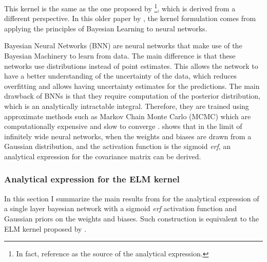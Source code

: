 This kernel is the same as the one proposed by \textcite{williamsComputationInfiniteNeural1998}\footnote{
    In fact, \textcite{frenayParameterinsensitiveKernelExtreme2011} reference \textcite{williamsComputationInfiniteNeural1998} as the source of the analytical
expression.}, which is derived from a different perspective.
In this older paper by \citeauthor{williamsComputationInfiniteNeural1998}, the kernel formulation comes from
applying the principles of Bayesian Learning to neural networks\cite{nealBayesianLearningNeural1996,bishopBayesianNeuralNetworks1997}.

Bayesian Neural Networks (BNN) are neural networks that make use of the Bayesian Machinery to learn
from data. The main difference is that these networks use distributions instead of point estimates\cite{nealBayesianLearningNeural1996}.
This allows the network to have a better understanding of the uncertainty of the data, which reduces
overfitting and allows having uncertainty estimates for the predictions. The main drawback of BNNs
is that they require computation of the posterior distribution, which is an analytically intractable
integral. Therefore, they are trained using approximate methods such as Markov Chain Monte Carlo (MCMC) which
are computationally expensive and slow to converge \cite{nealBayesianTrainingBackpropagation1992}. \Textcite{williamsComputationInfiniteNeural1998}
shows that in the limit of infinitely wide neural networks, when the weights and biases are drawn from
a Gaussian distribution, and the activation function is the sigmoid \emph{erf}, an analytical expression
for the covariance matrix can be derived.

\subsubsection{Analytical expression for the ELM kernel}

In this section I summarize the main results from \textcite{williamsComputationInfiniteNeural1998} for the
analytical expression of a single layer bayesian network with a sigmoid \emph{erf} activation function and
Gaussian priors on the weights and biases. Such construction is equivalent to the ELM kernel proposed by
\textcite{frenayParameterinsensitiveKernelExtreme2011}.

